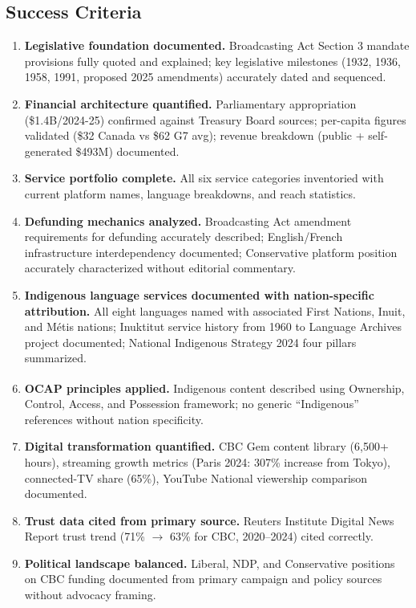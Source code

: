 \documentclass[11pt,letterpaper]{article}
\begin{document}
\subsection{Success Criteria}

\begin{enumerate}[leftmargin=*, label=\textbf{SC-\arabic*.}]
\item \textbf{Legislative foundation documented.} Broadcasting Act Section 3 mandate provisions fully quoted and explained; key legislative milestones (1932, 1936, 1958, 1991, proposed 2025 amendments) accurately dated and sequenced.
\item \textbf{Financial architecture quantified.} Parliamentary appropriation (\$1.4B/2024-25) confirmed against Treasury Board sources; per-capita figures validated (\$32 Canada vs \$62 G7 avg); revenue breakdown (public + self-generated \$493M) documented.
\item \textbf{Service portfolio complete.} All six service categories inventoried with current platform names, language breakdowns, and reach statistics.
\item \textbf{Defunding mechanics analyzed.} Broadcasting Act amendment requirements for defunding accurately described; English/French infrastructure interdependency documented; Conservative platform position accurately characterized without editorial commentary.
\item \textbf{Indigenous language services documented with nation-specific attribution.} All eight languages named with associated First Nations, Inuit, and M\'etis nations; Inuktitut service history from 1960 to Language Archives project documented; National Indigenous Strategy 2024 four pillars summarized.
\item \textbf{OCAP\textsuperscript{\textregistered} principles applied.} Indigenous content described using Ownership, Control, Access, and Possession framework; no generic ``Indigenous'' references without nation specificity.
\item \textbf{Digital transformation quantified.} CBC Gem content library (6,500+ hours), streaming growth metrics (Paris 2024: 307\% increase from Tokyo), connected-TV share (65\%), YouTube National viewership comparison documented.
\item \textbf{Trust data cited from primary source.} Reuters Institute Digital News Report trust trend (71\% $\rightarrow$ 63\% for CBC, 2020--2024) cited correctly.
\item \textbf{Political landscape balanced.} Liberal, NDP, and Conservative positions on CBC funding documented from primary campaign and policy sources without advocacy framing.

\end{enumerate}
\end{document}
